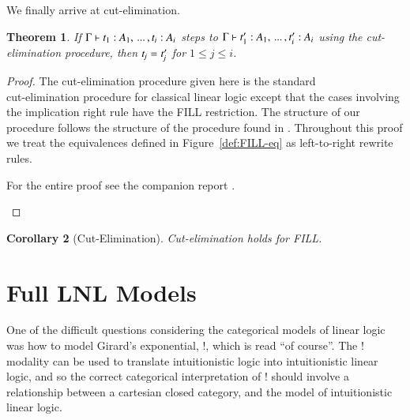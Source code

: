 \documentclass{elsarticle}
\newtheorem{theorem}{Theorem}
\newtheorem{corollary}[theorem]{Corollary}
\begin{document}
We finally arrive at cut-elimination.
\begin{theorem}
  \label{thm:cut-pro}
  If $ \Gamma  \vdash  \mathit{t_{{\mathrm{1}}}}  :  \mathit{A_{{\mathrm{1}}}}  , \, ... \, ,  \mathit{t_{\mathit{i}}}  :  \mathit{A_{\mathit{i}}} $ steps to $ \Gamma  \vdash  \mathit{t'_{{\mathrm{1}}}}  :  \mathit{A_{{\mathrm{1}}}}  , \, ... \, ,  \mathit{t'_{\mathit{i}}}  :  \mathit{A_{\mathit{i}}} $ using the cut-elimination procedure, then $\mathit{t_{\mathit{j}}}  =  \mathit{t'_{\mathit{j}}}$
  for $1 \leq j \leq i$.
\end{theorem}
\begin{proof}
  The cut-elimination procedure given here is the standard\\
  cut-elimination
  procedure for classical linear logic except that the
  cases involving the implication right rule have the FILL
  restriction. The structure of our procedure follows the structure of
  the procedure found in \cite{Mellies:2009}. Throughout this proof we
  treat the equivalences defined in Figure~\ref{def:FILL-eq} as
  left-to-right rewrite rules. \begin{paper} For the entire proof see
    the companion report \cite{Eades:2015}.\end{paper}
  
\end{proof}

\begin{corollary}[Cut-Elimination]
  \label{corollary:cut-elimination}
  Cut-elimination holds for FILL.
\end{corollary}

\section{Full LNL Models}
\label{sec:full_lnl_models}
One of the difficult questions considering the categorical models of
linear logic was how to model Girard's exponential, $!$, which is read
``of course''.  The $!$ modality can be used to translate
intuitionistic logic into intuitionistic linear logic, and so the
correct categorical interpretation of $!$ should involve a
relationship between a cartesian closed category, and the model of
intuitionistic linear logic.
\end{document}
